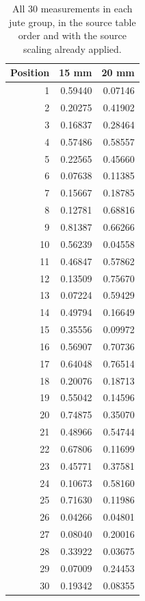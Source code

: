 \begin{table}[htbp]
\centering
\caption{All 30 measurements in each jute group, in the source table order and with the source scaling already applied.}\label{tab:jute-complete}
\small
\begin{tabular}{rrr}
\toprule
Position & 15 mm & 20 mm \\
\midrule
1 & 0.59440 & 0.07146 \\
2 & 0.20275 & 0.41902 \\
3 & 0.16837 & 0.28464 \\
4 & 0.57486 & 0.58557 \\
5 & 0.22565 & 0.45660 \\
6 & 0.07638 & 0.11385 \\
7 & 0.15667 & 0.18785 \\
8 & 0.12781 & 0.68816 \\
9 & 0.81387 & 0.66266 \\
10 & 0.56239 & 0.04558 \\
11 & 0.46847 & 0.57862 \\
12 & 0.13509 & 0.75670 \\
13 & 0.07224 & 0.59429 \\
14 & 0.49794 & 0.16649 \\
15 & 0.35556 & 0.09972 \\
16 & 0.56907 & 0.70736 \\
17 & 0.64048 & 0.76514 \\
18 & 0.20076 & 0.18713 \\
19 & 0.55042 & 0.14596 \\
20 & 0.74875 & 0.35070 \\
21 & 0.48966 & 0.54744 \\
22 & 0.67806 & 0.11699 \\
23 & 0.45771 & 0.37581 \\
24 & 0.10673 & 0.58160 \\
25 & 0.71630 & 0.11986 \\
26 & 0.04266 & 0.04801 \\
27 & 0.08040 & 0.20016 \\
28 & 0.33922 & 0.03675 \\
29 & 0.07009 & 0.24453 \\
30 & 0.19342 & 0.08355 \\
\bottomrule
\end{tabular}
\end{table}
